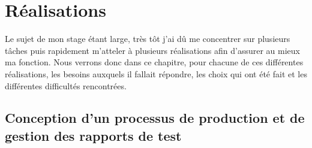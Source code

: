 \chapter{Réalisations}



Le sujet de mon stage étant large, très tôt j'ai dû me concentrer sur plusieurs tâches puis rapidement m'atteler à plusieurs réalisations afin d'assurer au mieux ma fonction. Nous verrons donc dans ce chapitre, pour chacune de ces différentes réalisations, les besoins auxquels il fallait répondre, les choix qui ont été fait et les différentes difficultés rencontrées.

\section{Conception d'un processus de production et de gestion des rapports de test}
